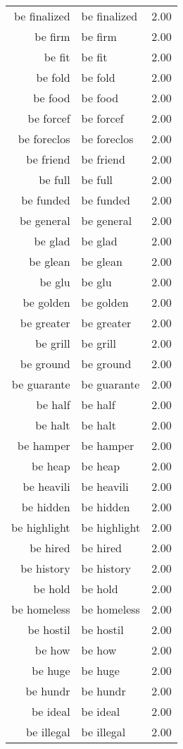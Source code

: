 \begin{table}[ht]
\begin{tabular}{rlr}
  be finalized & be finalized & 2.00 \\ 
  be firm & be firm & 2.00 \\ 
  be fit & be fit & 2.00 \\ 
  be fold & be fold & 2.00 \\ 
  be food & be food & 2.00 \\ 
  be forcef & be forcef & 2.00 \\ 
  be foreclos & be foreclos & 2.00 \\ 
  be friend & be friend & 2.00 \\ 
  be full & be full & 2.00 \\ 
  be funded & be funded & 2.00 \\ 
  be general & be general & 2.00 \\ 
  be glad & be glad & 2.00 \\ 
  be glean & be glean & 2.00 \\ 
  be glu & be glu & 2.00 \\ 
  be golden & be golden & 2.00 \\ 
  be greater & be greater & 2.00 \\ 
  be grill & be grill & 2.00 \\ 
  be ground & be ground & 2.00 \\ 
  be guarante & be guarante & 2.00 \\ 
  be half & be half & 2.00 \\ 
  be halt & be halt & 2.00 \\ 
  be hamper & be hamper & 2.00 \\ 
  be heap & be heap & 2.00 \\ 
  be heavili & be heavili & 2.00 \\ 
  be hidden & be hidden & 2.00 \\ 
  be highlight & be highlight & 2.00 \\ 
  be hired & be hired & 2.00 \\ 
  be history & be history & 2.00 \\ 
  be hold & be hold & 2.00 \\ 
  be homeless & be homeless & 2.00 \\ 
  be hostil & be hostil & 2.00 \\ 
  be how & be how & 2.00 \\ 
  be huge & be huge & 2.00 \\ 
  be hundr & be hundr & 2.00 \\ 
  be ideal & be ideal & 2.00 \\ 
  be illegal & be illegal & 2.00 \\ 

\end{tabular}
\end{table}
